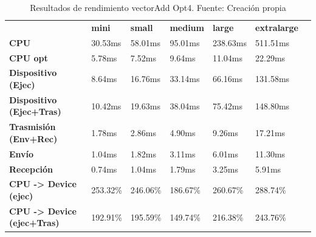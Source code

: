 \begin{table}[H]
    \centering
    \begin{tabular}{lllllll}
    \rowcolor[HTML]{DAE8FC} \ &  \textbf{mini} &  \textbf{small} &  \textbf{medium} &  \textbf{	large} &  \textbf{	extralarge} \\
    \cellcolor[HTML]{DAE8FC} \textbf{CPU} & 30.53ms & 58.01ms & 95.01ms & 	238.63ms & 	511.51ms \\
    \rowcolor[HTML]{EFEFEF} \cellcolor[HTML]{DAE8FC} \textbf{CPU opt} & 5.78ms & 7.52ms & 9.64ms & 	11.04ms & 	22.29ms \\
    \cellcolor[HTML]{DAE8FC} \textbf{Dispositivo (Ejec)} & 8.64ms & 16.76ms & 33.14ms & 	66.16ms & 	131.58ms \\
    \rowcolor[HTML]{EFEFEF} \cellcolor[HTML]{DAE8FC} \textbf{Dispositivo (Ejec+Tras)} & 10.42ms & 19.63ms & 38.04ms & 	75.42ms & 	148.80ms \\
    \cellcolor[HTML]{DAE8FC} \textbf{Trasmisión (Env+Rec)} & 1.78ms & 2.86ms & 4.90ms & 	9.26ms & 	17.21ms \\
    \rowcolor[HTML]{EFEFEF} \cellcolor[HTML]{DAE8FC} \textbf{Envío} & 1.04ms & 1.82ms & 3.11ms & 	6.01ms & 	11.30ms \\
    \cellcolor[HTML]{DAE8FC} \textbf{Recepción} & 0.74ms & 1.04ms & 1.79ms & 	3.25ms & 	5.91ms \\
    \rowcolor[HTML]{EFEFEF} \cellcolor[HTML]{DAE8FC} \textbf{CPU -> Device (ejec)} & 253.32\% & 246.06\% & 186.67\% & 	260.67\% & 	288.74\% \\
    \cellcolor[HTML]{DAE8FC} \textbf{CPU -> Device (ejec+Tras)} & 192.91\% & 195.59\% & 149.74\% & 	216.38\% & 	243.76\% \\
    \end{tabular}
    \caption[Resultados de rendimiento vectorAdd Opt4]{{Resultados de rendimiento vectorAdd Opt4. Fuente: Creación propia}}
    \label{table_test_vectorAdd_Opt4_hw_performanceResults}
\end{table}